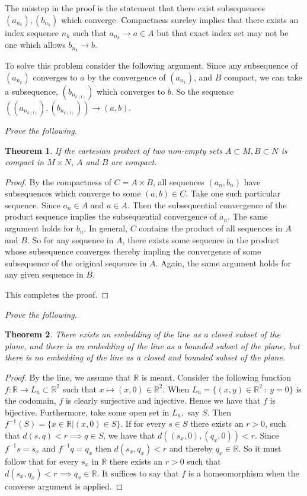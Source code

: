 \documentclass[letter]{article}
\newtheorem{theorem}{Theorem}
\newenvironment{menumerate}{%
  \edef\backupindent{\the\parindent}%
  \enumerate%
  \setlength{\parindent}{\backupindent}%
}{\endenumerate}
\begin{document}
\begin{menumerate}
		 The misstep in the proof is the statement that there exist subsequences $(a_{n_k}), (b_{n_k}) $ which converge. Compactness sureley implies that there exists an index sequence $n_k$ such that $a_{n_k} \to a \in A$ but that exact index set may not be one which allows $b_{n_k} \to b$. 

		To solve this problem consider the following argument. Since any subsequence of $(a_{n_k})$ converges to $a$ by the convergence of $(a_{n_k})$, and $B$ compact, we can take a subsequence, $(b_{n_{k(l)}})$ which converges to $b$. So the sequence $((a_{n_{k(l)}}),(b_{n_{k(l)}})) \to (a,b).$


		\item \emph{Prove the following.}
			\begin{theorem}
				If the cartesian product of two non-empty sets $A \subset M, B \subset N$ is compact in $M\times N$, $A$ and $B$ are compact.
			\end{theorem}
			\begin{proof}
				By the compactness of $C = A \times B$, all sequences $(a_n,b_n)$ have subsequences which converge to some $(a,b) \in C.$ Take one such particular sequence. Since $a_n \in A$ and $a \in A$. Then the  subsequential convergence of the product sequence implies the subsequential convergence of $a_n$. The same argument holds for $b_n.$ In general, $C$ contains the product of all sequences in $A$ and $B$. So for any sequence in $A$, there exists some sequence in the product whose subsequence converges thereby impling the convergence of some subsequence of the original sequence in $A$. Again, the same argument holds for any given sequence in $B$.

				This completes the proof.
			\end{proof}


		\setcounter{enumi}{47}
		\item \emph{Prove the following.}
			\begin{theorem}
				There exists an embedding of the line as a closed subset of the plane, and there is an embedding of the line as a bounded subset of the plane, but there is no embedding of the line as a closed and bounded subset of the plane.
			\end{theorem}
			\begin{proof}
				By the line, we assume that $\mathbb{R}$ is meant. Consider the following function $f: \mathbb{R} \to {L_u} \subset \mathbb{R}^2$ such that $x \mapsto (x,0) \in \mathbb{R}^2.$ When $L_u = \{(x,y) \in \mathbb{R}^2\ : \ y = 0\}$ is the codomain, $f$ is clearly surjective and injective. Hence we have that $f$ is bijective. Furthermore, take some open set in $L_u,$ say $S$. Then $f^{-1}(S) = \{x \in \mathbb{R} | (x,0) \in S \}$. If for every $s \in S$ there exists an $r > 0$, such that $d(s,q) < r \implies q \in S$, we have that $d((s_x,0),(q_x,0)) < r.$ Since $f^{-1}s = s_x$ and $f^{-1}q = q_x$ then $d(s_x, q_x) < r$ and thereby $q_x \in \mathbb{R}.$ So it must follow that for every $s_x$ in $\mathbb{R}$ there exists an $r > 0$ such that $d(s_x, q_x) < r \implies q_x \in \mathbb{R}$. It suffices to say that $f$ is a homeomorphism when the converse argument is applied.


\end{proof}
\end{menumerate}
\end{document}
